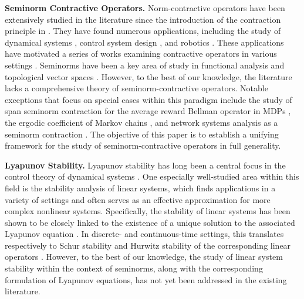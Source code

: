 \documentclass[11 pt]{article}
\begin{document}
	\textbf{Seminorm Contractive Operators.} Norm-contractive operators have been extensively studied in the literature since the introduction of the contraction principle in \cite{banach1922operations}. They have found numerous applications, including the study of dynamical systems \cite{lohmiller1998contraction}, control system design \cite{Lohmiller2000}, and robotics \cite{Manchester2018}. These applications have motivated a series of works examining contractive operators in various settings \cite{pham2009contraction, tsukamoto2021contraction, Bullo2022}. Seminorms have been a key area of study in functional analysis \cite{conway2019course} and topological vector spaces \cite{bourbaki2013topological}. However, to the best of our knowledge, the literature lacks a comprehensive theory of seminorm-contractive operators. Notable exceptions that focus on special cases within this paradigm include the study of span seminorm contraction for the average reward Bellman operator in MDPs \cite{puterman2014markov}, the ergodic coefficient of Markov chains \cite{Bullo2023}, and network systems analysis as a seminorm contraction \cite{jafarpour2022}. The objective of this paper is to establish a unifying framework for the study of seminorm-contractive operators in full generality.
	
	
	\textbf{Lyapunov Stability.} Lyapunov stability has long been a central focus in the control theory of dynamical systems \cite{khalil2002nonlinear, khalil2009lyapunov}. One especially well-studied area within this field is the stability analysis of linear systems, which finds applications in a variety of settings and often serves as an effective approximation for more complex nonlinear systems. Specifically, the stability of linear systems has been shown to be closely linked to the existence of a unique solution to the associated Lyapunov equation \cite{lyapunov, bartels1972algorithm}. In discrete- and continuous-time settings, this translates respectively to Schur stability and Hurwitz stability of the corresponding linear operators \cite{hinrichsen2005mathematical}. However, to the best of our knowledge, the study of linear system stability within the context of seminorms, along with the corresponding formulation of Lyapunov equations, has not yet been addressed in the existing literature.
	
\end{document}
